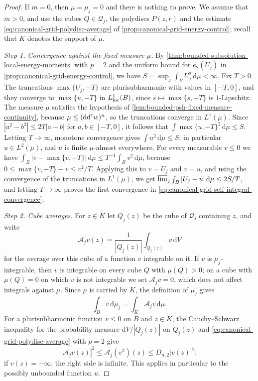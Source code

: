 \begin{proof}
If $m=0$, then $\mu=\mu_j=0$ and there is nothing to prove. We assume that $m>0$, and use the cubes $Q\in\mathcal Q_j$, the polydiscs $P(z,r)$ and the estimate \eqref{eq:canonical-grid-polydisc-average} of \cref{prop:canonical-grid-energy-control}; recall that $K$ denotes the support of $\mu$.

\emph{Step 1. Convergence against the fixed measure $\mu$.}
By \cref{thm:bounded-subsolution-local-energy-moments} with $p=2$ and the uniform bound for $e_2(U_j)$ in \cref{prop:canonical-grid-energy-control}, we have $S=\sup_j\int_BU_j^2\,\mathrm d\mu<\infty$. Fix $T>0$. The truncations $\max\{U_j,-T\}$ are plurisubharmonic with values in $[-T,0]$, and they converge to $\max\{u,-T\}$ in $L^1_{\mathrm{loc}}(B)$, since $s\mapsto\max\{s,-T\}$ is $1$-Lipschitz. The measure $\mu$ satisfies the hypothesis of \cref{lem:bounded-psh-fixed-measure-continuity}, because $\mu\le(\mathrm{dd}^{\mathrm{c}} w)^n$, so the truncations converge in $L^1(\mu)$. Since $|a^2-b^2|\le2T|a-b|$ for $a,b\in[-T,0]$, it follows that $\int\max\{u,-T\}^2\,\mathrm d\mu\le S$. Letting $T\to\infty$, monotone convergence gives $\int u^2\,\mathrm d\mu\le S$; in particular $u\in L^2(\mu)$, and $u$ is finite $\mu$-almost everywhere. For every measurable $v\le0$ we have $\int_B|v-\max\{v,-T\}|\,\mathrm d\mu\le T^{-1}\int_Bv^2\,\mathrm d\mu$, because $0\le\max\{v,-T\}-v\le v^2/T$. Applying this to $v=U_j$ and $v=u$, and using the convergence of the truncations in $L^1(\mu)$, we get $\varlimsup_j\int_B|U_j-u|\,\mathrm d\mu\le2S/T$, and letting $T\to\infty$ proves the first convergence in \eqref{eq:canonical-grid-self-integral-convergence}.

\emph{Step 2. Cube averages.}
For $z\in K$ let $Q_j(z)$ be the cube of $\mathcal Q_j$ containing $z$, and write
\[
 \mathcal A_jv(z)=\frac1{|Q_j(z)|}\int_{Q_j(z)}v\,\mathrm dV
\]
for the average over this cube of a function $v$ integrable on it. If $v$ is $\mu_j$-integrable, then $v$ is integrable on every cube $Q$ with $\mu(Q)>0$; on a cube with $\mu(Q)=0$ on which $v$ is not integrable we set $\mathcal A_jv=0$, which does not affect integrals against $\mu$. Since $\mu$ is carried by $K$, the definition of $\mu_j$ gives
\begin{equation}\label{eq:canonical-grid-cell-pairing}
 \int_Bv\,\mathrm d\mu_j=\int_K\mathcal A_jv\,\mathrm d\mu.
\end{equation}
For a plurisubharmonic function $v\le0$ on $B$ and $z\in K$, the Cauchy--Schwarz inequality for the probability measure $\mathrm dV/|Q_j(z)|$ on $Q_j(z)$ and \eqref{eq:canonical-grid-polydisc-average} with $p=2$ give
\begin{equation}\label{eq:canonical-grid-cell-square}
 |\mathcal A_jv(z)|^2
 \leq\mathcal A_j(v^2)(z)\leq D_{n,2}|v(z)|^2;
\end{equation}
if $v(z)=-\infty$, the right side is infinite. This applies in particular to the possibly unbounded function $u$.


\end{proof}
